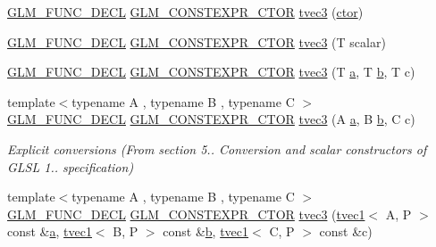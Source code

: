 \begin{DoxyCompactItemize}
\item 
\mbox{\hyperlink{setup_8hpp_ab2d052de21a70539923e9bcbf6e83a51}{G\+L\+M\+\_\+\+F\+U\+N\+C\+\_\+\+D\+E\+CL}} \mbox{\hyperlink{setup_8hpp_ad34178a09666081abdb573c14d1f4a5a}{G\+L\+M\+\_\+\+C\+O\+N\+S\+T\+E\+X\+P\+R\+\_\+\+C\+T\+OR}} \mbox{\hyperlink{structglm_1_1tvec3_acc749f04310a98570be6dae2c7e0cab7}{tvec3}} (\mbox{\hyperlink{namespaceglm_a807df837905ec286f806a536af03b57f}{ctor}})
\item 
\mbox{\hyperlink{setup_8hpp_ab2d052de21a70539923e9bcbf6e83a51}{G\+L\+M\+\_\+\+F\+U\+N\+C\+\_\+\+D\+E\+CL}} \mbox{\hyperlink{setup_8hpp_ad34178a09666081abdb573c14d1f4a5a}{G\+L\+M\+\_\+\+C\+O\+N\+S\+T\+E\+X\+P\+R\+\_\+\+C\+T\+OR}} \mbox{\hyperlink{structglm_1_1tvec3_a1329577850d2744fd2ffca1cceed204e}{tvec3}} (T scalar)
\item 
\mbox{\hyperlink{setup_8hpp_ab2d052de21a70539923e9bcbf6e83a51}{G\+L\+M\+\_\+\+F\+U\+N\+C\+\_\+\+D\+E\+CL}} \mbox{\hyperlink{setup_8hpp_ad34178a09666081abdb573c14d1f4a5a}{G\+L\+M\+\_\+\+C\+O\+N\+S\+T\+E\+X\+P\+R\+\_\+\+C\+T\+OR}} \mbox{\hyperlink{structglm_1_1tvec3_a8f6009dac87a911fe7f7d9fe61069160}{tvec3}} (T \mbox{\hyperlink{glad_8h_ac8729153468b5dcf13f971b21d84d4e5}{a}}, T \mbox{\hyperlink{glad_8h_a6eba317e3cf44d6d26c04a5a8f197dcb}{b}}, T c)
\item 
{\footnotesize template$<$typename A , typename B , typename C $>$ }\\\mbox{\hyperlink{setup_8hpp_ab2d052de21a70539923e9bcbf6e83a51}{G\+L\+M\+\_\+\+F\+U\+N\+C\+\_\+\+D\+E\+CL}} \mbox{\hyperlink{setup_8hpp_ad34178a09666081abdb573c14d1f4a5a}{G\+L\+M\+\_\+\+C\+O\+N\+S\+T\+E\+X\+P\+R\+\_\+\+C\+T\+OR}} \mbox{\hyperlink{structglm_1_1tvec3_a29041b5d9ab0f37592aa414a7bae7b7f}{tvec3}} (A \mbox{\hyperlink{glad_8h_ac8729153468b5dcf13f971b21d84d4e5}{a}}, B \mbox{\hyperlink{glad_8h_a6eba317e3cf44d6d26c04a5a8f197dcb}{b}}, C c)
\begin{DoxyCompactList}\small\item\em Explicit conversions (From section 5.. Conversion and scalar constructors of G\+L\+SL 1.. specification) \end{DoxyCompactList}\item 
{\footnotesize template$<$typename A , typename B , typename C $>$ }\\\mbox{\hyperlink{setup_8hpp_ab2d052de21a70539923e9bcbf6e83a51}{G\+L\+M\+\_\+\+F\+U\+N\+C\+\_\+\+D\+E\+CL}} \mbox{\hyperlink{setup_8hpp_ad34178a09666081abdb573c14d1f4a5a}{G\+L\+M\+\_\+\+C\+O\+N\+S\+T\+E\+X\+P\+R\+\_\+\+C\+T\+OR}} \mbox{\hyperlink{structglm_1_1tvec3_a8a3b26477d6b597f1dc0e98ad72862d0}{tvec3}} (\mbox{\hyperlink{structglm_1_1tvec1}{tvec1}}$<$ A, P $>$ const \&\mbox{\hyperlink{glad_8h_ac8729153468b5dcf13f971b21d84d4e5}{a}}, \mbox{\hyperlink{structglm_1_1tvec1}{tvec1}}$<$ B, P $>$ const \&\mbox{\hyperlink{glad_8h_a6eba317e3cf44d6d26c04a5a8f197dcb}{b}}, \mbox{\hyperlink{structglm_1_1tvec1}{tvec1}}$<$ C, P $>$ const \&c)

\end{DoxyCompactItemize}

